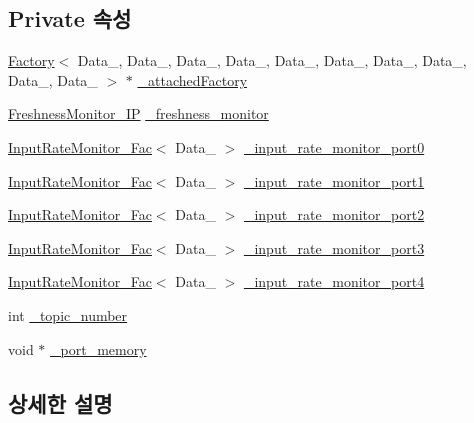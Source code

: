 \subsection*{Private 속성}
\begin{DoxyCompactItemize}
\item 
\hyperlink{classFactory}{Factory}$<$ Data\+\_, Data\+\_, Data\+\_, Data\+\_, Data\+\_, Data\+\_, Data\+\_, Data\+\_, Data\+\_, Data\+\_ $>$ $\ast$ \hyperlink{classInputDataPort__Fac_a5978d61d3b32c4610a102e44179ce3c5}{\+\_\+attached\+Factory}
\item 
\hyperlink{classFreshnessMonitor__IP}{Freshness\+Monitor\+\_\+\+IP} \hyperlink{classInputDataPort__Fac_ae9458e7627cc26884a106de9d091d399}{\+\_\+freshness\+\_\+monitor}
\item 
\hyperlink{classInputRateMonitor__Fac}{Input\+Rate\+Monitor\+\_\+\+Fac}$<$ Data\+\_ $>$ \hyperlink{classInputDataPort__Fac_a91153b4dfaf9af79df3223ec7f17eab2}{\+\_\+input\+\_\+rate\+\_\+monitor\+\_\+port0}
\item 
\hyperlink{classInputRateMonitor__Fac}{Input\+Rate\+Monitor\+\_\+\+Fac}$<$ Data\+\_ $>$ \hyperlink{classInputDataPort__Fac_aaff3c7535d1e29e218a6653e7f874e34}{\+\_\+input\+\_\+rate\+\_\+monitor\+\_\+port1}
\item 
\hyperlink{classInputRateMonitor__Fac}{Input\+Rate\+Monitor\+\_\+\+Fac}$<$ Data\+\_ $>$ \hyperlink{classInputDataPort__Fac_afa172d6bd94489f7634ad91440c10a16}{\+\_\+input\+\_\+rate\+\_\+monitor\+\_\+port2}
\item 
\hyperlink{classInputRateMonitor__Fac}{Input\+Rate\+Monitor\+\_\+\+Fac}$<$ Data\+\_ $>$ \hyperlink{classInputDataPort__Fac_a6675cd4e6a4ccb6b2b8c8535aa9cd9f4}{\+\_\+input\+\_\+rate\+\_\+monitor\+\_\+port3}
\item 
\hyperlink{classInputRateMonitor__Fac}{Input\+Rate\+Monitor\+\_\+\+Fac}$<$ Data\+\_ $>$ \hyperlink{classInputDataPort__Fac_a4fe6b7be1eb68bd69bd8fa62e4a3eb2f}{\+\_\+input\+\_\+rate\+\_\+monitor\+\_\+port4}
\item 
int \hyperlink{classInputDataPort__Fac_ad39fee414d67b42e824bad1a16a3bd87}{\+\_\+topic\+\_\+number}
\item 
void $\ast$ \hyperlink{classInputDataPort__Fac_a6c10484e54395bef3479ae6d1bbab04d}{\+\_\+port\+\_\+memory}
\end{DoxyCompactItemize}


\subsection{상세한 설명}
